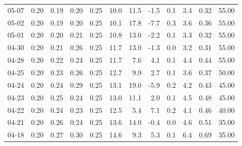 \begin{threeparttable}
{\begin{tabular}{lrrrrrrrrrrr}
  05-07 &          0.20 &          0.19 &          0.20 &        0.25 &                10.0 &                11.5 &       -1.5 &                 0.1 &              3.4 &            0.32 &                  55.00 \\
  05-02 &          0.20 &          0.19 &          0.20 &        0.25 &                10.1 &                17.8 &       -7.7 &                 0.3 &              3.6 &            0.36 &                  55.00 \\
  05-01 &          0.20 &          0.20 &          0.21 &        0.25 &                10.8 &                13.0 &       -2.2 &                 0.1 &              3.3 &            0.32 &                  55.00 \\
  04-30 &          0.20 &          0.21 &          0.26 &        0.25 &                11.7 &                13.0 &       -1.3 &                 0.0 &              3.2 &            0.31 &                  55.00 \\
  04-28 &          0.20 &          0.22 &          0.24 &        0.25 &                11.7 &                 7.6 &        4.1 &                 0.1 &              4.4 &            0.44 &                  55.00 \\
  04-25 &          0.20 &          0.23 &          0.26 &        0.25 &                12.7 &                 9.9 &        2.7 &                 0.1 &              3.6 &            0.37 &                  50.00 \\
  04-24 &          0.20 &          0.24 &          0.29 &        0.25 &                13.1 &                19.0 &       -5.9 &                 0.2 &              4.2 &            0.43 &                  45.00 \\
  04-23 &          0.20 &          0.25 &          0.24 &        0.25 &                13.0 &                11.1 &        2.0 &                 0.1 &              4.5 &            0.48 &                  45.00 \\
  04-22 &          0.20 &          0.24 &          0.23 &        0.25 &                12.5 &                 5.4 &        7.1 &                 0.2 &              4.1 &            0.46 &                  40.00 \\
  04-21 &          0.20 &          0.26 &          0.24 &        0.25 &                13.6 &                14.0 &       -0.4 &                 0.0 &              4.6 &            0.51 &                  35.00 \\
  04-18 &          0.20 &          0.27 &          0.30 &        0.25 &                14.6 &                 9.3 &        5.3 &                 0.1 &              6.4 &            0.69 &                  35.00 \\

\end{tabular}}
\end{threeparttable}

